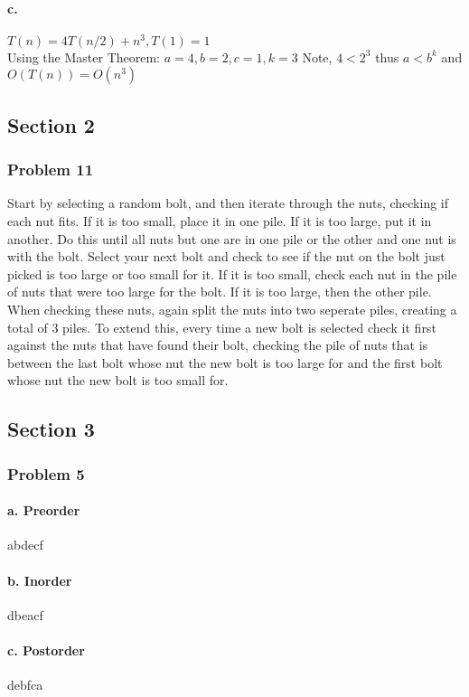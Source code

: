 \documentclass{article}
\newcommand\ttab[0]{\tabto{5mm}}
\newcommand\tttab[0]{\tabto{1cm}}
\begin{document}
          \paragraph{c.}
          $T(n) = 4T(n/2) + n^3, T(1) = 1$\\
          \ttab Using the Master Theorem:
          \tttab $a=4, b=2, c=1, k=3$
          \tttab Note, $4<2^3$ thus $a<b^k$ and $O(T(n)) = O(n^3)$
    \subsection{Section 2}
      \subsubsection{Problem 11}
        Start by selecting a random bolt, and then iterate through the nuts, checking if each nut
        fits. If it is too small, place it in one pile. If it is too large, put it in another.
        Do this until all nuts but one are in one pile or the other and one nut is with the bolt.
        Select your next bolt and check to see if the nut on the bolt just picked is too large or too small for it. If it is too small, check each nut in the pile of nuts that were too large for the bolt. If it is too large, then the other pile. When checking these nuts, again split the nuts into two seperate piles, creating a total of 3 piles.
        To extend this, every time a new bolt is selected check it first against the nuts that have found their bolt, checking the pile of nuts that is between the last bolt whose nut the new bolt is too large for and the first bolt whose nut the new bolt is too small for.
    \subsection{Section 3}
      \subsubsection{Problem 5}
        \paragraph{a. Preorder}
        \ttab abdecf
        \paragraph{b. Inorder}
        \ttab dbeacf
        \paragraph{c. Postorder}
        \ttab debfca
\end{document}
